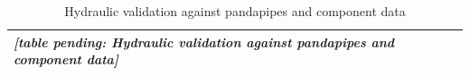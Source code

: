 \begin{table}[t]
\centering
\caption{Hydraulic validation against pandapipes and component data}
\label{tab:hydraulic_val}
\begin{tabular}{l}
\hline
\textit{[table pending: Hydraulic validation against pandapipes and component data]} \\
\hline
\end{tabular}
\end{table}
